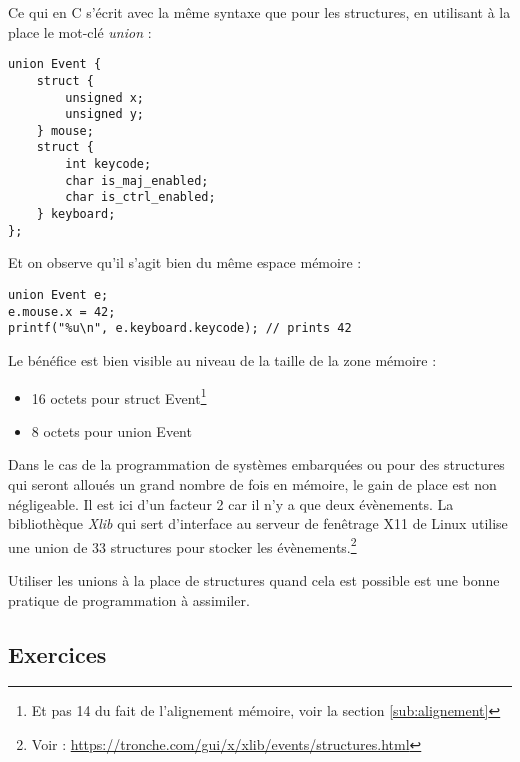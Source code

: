 \documentclass[../../../main.tex]{subfiles}
\begin{document}
\begin{minipage}{\textwidth}
	\begin{center}
		
	\end{center}
\end{minipage}

Ce qui en C s’écrit avec la même syntaxe que pour les structures, en utilisant à la place le mot-clé
\textit{union} :
\begin{verbatim}
union Event {
	struct {
		unsigned x;
		unsigned y;
	} mouse;
	struct {
		int keycode;
		char is_maj_enabled;
		char is_ctrl_enabled;
	} keyboard;
};
\end{verbatim}
Et on observe qu’il s’agit bien du même espace mémoire :
\begin{verbatim}
union Event e;
e.mouse.x = 42;
printf("%u\n", e.keyboard.keycode); // prints 42
\end{verbatim}
Le bénéfice est bien visible au niveau de la taille de la zone mémoire :
\begin{itemize}
	\item 16 octets pour \textsf{struct Event}\footnote{Et pas 14 du fait de l’alignement mémoire, voir la section \ref{sub:alignement}}
	\item 8 octets pour \textsf{union Event}
\end{itemize}
Dans le cas de la programmation de systèmes embarquées ou pour des structures qui seront alloués un
grand nombre de fois en mémoire, le gain de place est non négligeable. Il est ici d’un facteur 2 car il
n’y a que deux évènements. La bibliothèque \textit{Xlib} qui sert d’interface au serveur de fenêtrage X11 de
Linux utilise une union de 33 structures pour stocker les évènements.\footnote{Voir : \url{https://tronche.com/gui/x/xlib/events/structures.html}}

Utiliser les unions à la place de structures quand cela est possible est une bonne pratique de programmation
à assimiler.
\subsection{Exercices}
\end{document}
